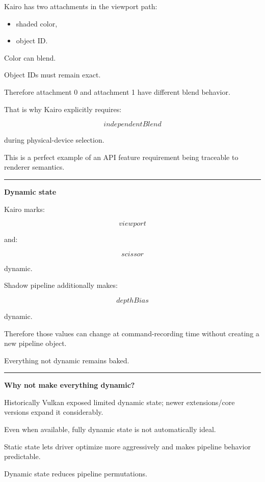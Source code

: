 Kairo has two attachments in the viewport path:

\begin{itemize}
\tightlist
\item
  shaded color,
\item
  object ID.
\end{itemize}

Color can blend.

Object IDs must remain exact.

Therefore attachment 0 and attachment 1 have different blend behavior.

That is why Kairo explicitly requires:

\[
\boxed{independentBlend}
\]

during physical-device selection.

This is a perfect example of an API feature requirement being traceable to renderer semantics.

\begin{center}\rule{0.5\linewidth}{0.5pt}\end{center}

\textbf{Dynamic state}

Kairo marks:

\[
viewport
\]

and:

\[
scissor
\]

dynamic.

Shadow pipeline additionally makes:

\[
depthBias
\]

dynamic.

Therefore those values can change at command-recording time without creating a new pipeline object.

Everything not dynamic remains baked.

\begin{center}\rule{0.5\linewidth}{0.5pt}\end{center}

\textbf{Why not make everything dynamic?}

Historically Vulkan exposed limited dynamic state; newer extensions/core versions expand it considerably.

Even when available, fully dynamic state is not automatically ideal.

Static state lets driver optimize more aggressively and makes pipeline behavior predictable.

Dynamic state reduces pipeline permutations.

